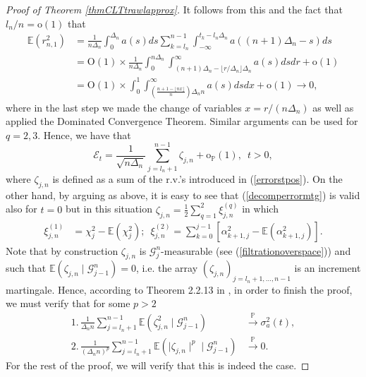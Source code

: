 \documentclass{article}
\theoremstyle{plain}
\theoremstyle{definition}
\theoremstyle{remark}
\begin{document}
\begin{appendix}
\begin{proof}[Proof of Theorem  \ref{thmCLTtrawlapprox}]
	It follows from this and the fact that $l_{n}/n=\mathrm{o}(1)$ that
	\begin{equation}\label{negligibilityerrors}
		\begin{aligned}
			\mathbb{E}(r_{n,1}^{2}) 
			& =\frac{1}{n\Delta_{n}}\int_{0}^{\Delta_{n}}a(s)ds\sum_{k=l_{n}}^{n-1}\int_{-\infty}^{t_{k}-l_{n}\Delta_{n}}a((n+1)\Delta_{n}-s)ds\\
			& =\mathrm{O}(1)\times\frac{1}{n\Delta_{n}}\int_{0}^{n\Delta_{n}}\int_{(n+1)\Delta_{n}- \lfloor r/\Delta_{n} \rfloor\Delta_{n}}^{\infty}a(s)dsdr+\mathrm{o}(1)\\
			& =\mathrm{O}(1)\times\int_{0}^{1}\int_{(\frac{n+1-\lfloor nx \rfloor}{n})\Delta_{n}n}^{\infty}a(s)dsdx+\mathrm{o}(1)\rightarrow0,
		\end{aligned}
	\end{equation}
	where in the last step we made the change of variables $x=r/(n\Delta_{n})$
	as well as applied the Dominated Convergence Theorem. Similar arguments
	can be used for $q=2,3$. Hence, we have that
	\begin{equation}
		\mathcal{E}_{t}=\frac{1}{\sqrt{n\Delta_{n}}}\sum_{j=l_{n}+1}^{n-1}\zeta_{j,n}+\mathrm{o}_{\mathbb{P}}(1),\,\,\,t>0,\label{decomperrormtg}
	\end{equation}
	where $\zeta_{j,n}$ is defined as a sum of the r.v.'s introduced
	in (\ref{errorstpos}). On the other hand, by arguing as above, it
	is easy to see that (\ref{decomperrormtg}) is valid also for $t=0$
	but in this situation $\zeta_{j,n}=\frac{1}{2}\sum_{q=1}^{2}\xi_{j,n}^{(q)}$
	in which 
	\begin{equation}
		\begin{aligned}\xi_{j,n}^{(1)} & =\chi_{j}^{2}-\mathbb{E}(\chi_{j}^{2});\,\,\,\xi_{j,n}^{(2)}=\sum_{k=0}^{j-1}[\alpha_{k+1,j}^{2}-\mathbb{E}(\alpha_{k+1,j}^{2})].\end{aligned}
		\label{errorstpos-1}
	\end{equation}
	Note that by construction $\zeta_{j,n}$ is $\mathscr{G}_{j}^{n}$-measurable
	(see (\ref{filtrationoverspace})) and such that $\mathbb{E}(\zeta_{j,n}\mid\mathscr{G}_{j-1}^{n})=0$,
	i.e. the array $(\zeta_{j,n})_{j=l_{n}+1,\ldots,n-1}$ is an increment
	martingale. Hence, according to Theorem 2.2.13 in \cite{JacProt11},
	in order to finish the proof, we must verify that for some $p>2$
	\begin{align}
		1.\,\frac{1}{\Delta_{n}n}\sum_{j=l_{n}+1}^{n-1}\mathbb{E}(\zeta_{j,n}^{2}\mid\mathscr{G}_{j-1}^{n}) & \overset{\mathbb{P}}{\rightarrow}\sigma_{a}^{2}(t),\label{asymptoticvar}\\
		2.\,\frac{1}{(\Delta_{n}n)^{p}}\sum_{j=l_{n}+1}^{n-1}\mathbb{E}(\mid\zeta_{j,n}\mid^{p}\mid\mathscr{G}_{j-1}^{n}) & \overset{\mathbb{P}}{\rightarrow}0.\label{linderbergfellercond}
	\end{align}
	For the rest of the proof, we will verify that this is indeed the
	case.
	

\end{proof}
\end{appendix}
\end{document}
